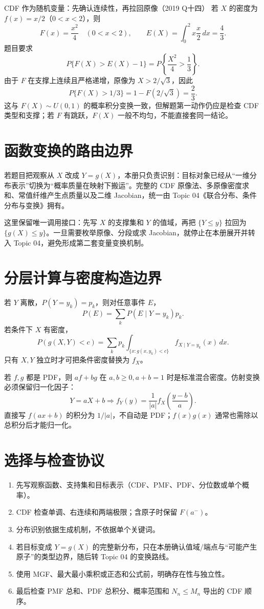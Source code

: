 \documentclass[11pt,a4paper]{ctexart}
\begin{document}
\begin{examplebox}{CDF 作为随机变量：先确认连续性，再拉回原像（2019 Q十四）}
若 $X$ 的密度为 $f(x)=x/2$（$0<x<2$），则
\[
F(x)=\frac{x^2}{4}\quad(0<x<2),\qquad E(X)=\int_0^2x\frac{x}{2}\,dx=\frac43.
\]
题目要求
\[
P\{F(X)>E(X)-1\}=P\left\{\frac{X^2}{4}>\frac13\right\}.
\]
由于 $F$ 在支撑上连续且严格递增，原像为 $X>2/\sqrt3$，因此
\[
P\{F(X)>1/3\}=1-F(2/\sqrt3)=\frac23.
\]
这与 $F(X)\sim U(0,1)$ 的概率积分变换一致，但解题第一动作仍应是检查 CDF 类型和支撑；若 $F$ 有跳跃，$F(X)$ 一般不均匀，不能直接套同一结论。
\end{examplebox}

\section{函数变换的路由边界}

若题目把观察从 $X$ 改成 $Y=g(X)$，本册只负责识别：目标对象已经从“一维分布表示”切换为“概率质量在映射下搬运”。完整的 CDF 原像法、多原像密度求和、常值纤维产生点质量以及二维 Jacobian，统一由 Topic 04《联合分布、条件分布与变换》拥有。

这里保留唯一调用接口：先写 $X$ 的支撑集和 $Y$ 的值域，再把 $\{Y\le y\}$ 拉回为 $\{g(X)\le y\}$。一旦需要枚举原像、分段或求 Jacobian，就停止在本册展开并转入 Topic 04，避免形成第二套变量变换机制。

\section{分层计算与密度构造边界}

若 $Y$ 离散，$P(Y=y_k)=p_k$，则对任意事件 $E$，
\[
P(E)=\sum_kP(E\mid Y=y_k)p_k.
\]
若条件下 $X$ 有密度，
\[
P(g(X,Y)<c)=\sum_kp_k\int_{\{x:g(x,y_k)<c\}}f_{X\mid Y=y_k}(x)\,dx.
\]
只有 $X,Y$ 独立时才可把条件密度替换为 $f_X$。

若 $f,g$ 都是 PDF，则 $af+bg$ 在 $a,b\ge0,a+b=1$ 时是标准混合密度。仿射变换必须保留归一化因子：
\[
Y=aX+b\Longrightarrow f_Y(y)=\frac1{\lvert a\rvert}f_X\left(\frac{y-b}{a}\right).
\]
直接写 $f(ax+b)$ 的积分为 $1/\lvert a\rvert$，不自动是 PDF；$f(x)g(x)$ 通常也需除以总积分后才能归一化。

\section{选择与检查协议}
\begin{enumerate}
\item 先写观察函数、支持集和目标表示（CDF、PMF、PDF、分位数或单个概率）。
\item CDF 检查单调、右连续和两端极限；含原子时保留 $F(a^-)$。
\item 分布识别依据生成机制，不依据单个关键词。
\item 若目标变成 $Y=g(X)$ 的完整新分布，只在本册确认值域/端点与“可能产生原子”的类型边界，随后转 Topic 04 的变换路线。
\item 使用 MGF、最大最小乘积或正态和公式前，明确存在性与独立性。
\item 最后检查 PMF 总和、PDF 总积分、概率范围和 $N_n\le M_n$ 导出的 CDF 顺序。
\end{enumerate}
\end{document}
